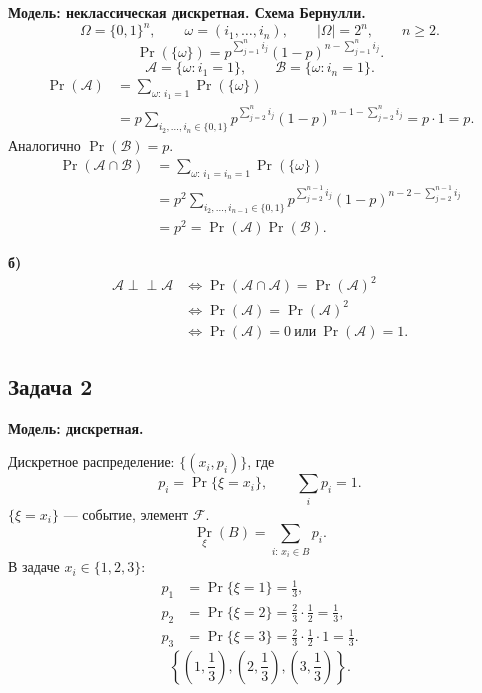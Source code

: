 \begin{solution}
    \medskip
    \textbf{Модель: неклассическая дискретная. Схема Бернулли.}
    \[
        \Omega=\{0,1\}^n,\qquad
        \omega=(i_1,\ldots,i_n),\qquad |\Omega|=2^n,\qquad n\geq2.
    \]
    \[
        \Pr(\{\omega\})
        =p^{\sum_{j=1}^n i_j}(1-p)^{n-\sum_{j=1}^n i_j}.
    \]
    \[
        \mathcal{A}=\{\omega:i_1=1\},\qquad
        \mathcal{B}=\{\omega:i_n=1\}.
    \]
    \[
        \begin{aligned}
            \Pr(\mathcal{A})
            &=\sum_{\omega:\,i_1=1}\Pr(\{\omega\})\\
            &=p\sum_{i_2,\ldots,i_n\in\{0,1\}}
                p^{\sum_{j=2}^n i_j}
                (1-p)^{n-1-\sum_{j=2}^n i_j}
             =p\cdot1=p.
        \end{aligned}
    \]
    Аналогично $\Pr(\mathcal{B})=p$.
    \[
        \begin{aligned}
            \Pr(\mathcal{A}\cap\mathcal{B})
            &=\sum_{\omega:\,i_1=i_n=1}\Pr(\{\omega\})\\
            &=p^2\sum_{i_2,\ldots,i_{n-1}\in\{0,1\}}
                p^{\sum_{j=2}^{n-1}i_j}
                (1-p)^{n-2-\sum_{j=2}^{n-1}i_j}\\
            &=p^2=\Pr(\mathcal{A})\Pr(\mathcal{B}).
        \end{aligned}
    \]

    \textbf{б)}
    \[
        \begin{aligned}
            \mathcal{A}\perp\!\!\!\perp\mathcal{A}
            &\iff\Pr(\mathcal{A}\cap\mathcal{A})=\Pr(\mathcal{A})^2\\
            &\iff\Pr(\mathcal{A})=\Pr(\mathcal{A})^2\\
            &\iff\Pr(\mathcal{A})=0\ \text{или}\ \Pr(\mathcal{A})=1.
        \end{aligned}
    \]
\end{solution}

\subsection{Задача 2}

\begin{solution}
    \textbf{Модель: дискретная.}

    Дискретное распределение: $\{(x_i,p_i)\}$, где
    \[
        p_i=\Pr\{\xi=x_i\},\qquad \sum_i p_i=1.
    \]
    $\{\xi=x_i\}$ --- событие, элемент $\mathcal{F}$.
    \[
        \Pr_\xi(B)=\sum_{i:\,x_i\in B}p_i.
    \]
    В задаче $x_i\in\{1,2,3\}$:
    \[
        \begin{aligned}
            p_1&=\Pr\{\xi=1\}=\frac13,\\
            p_2&=\Pr\{\xi=2\}=\frac23\cdot\frac12=\frac13,\\
            p_3&=\Pr\{\xi=3\}=\frac23\cdot\frac12\cdot1=\frac13.
        \end{aligned}
    \]
    \[
        \boxed{\left\{\left(1,\frac13\right),
            \left(2,\frac13\right),\left(3,\frac13\right)\right\}}.
    \]
\end{solution}

